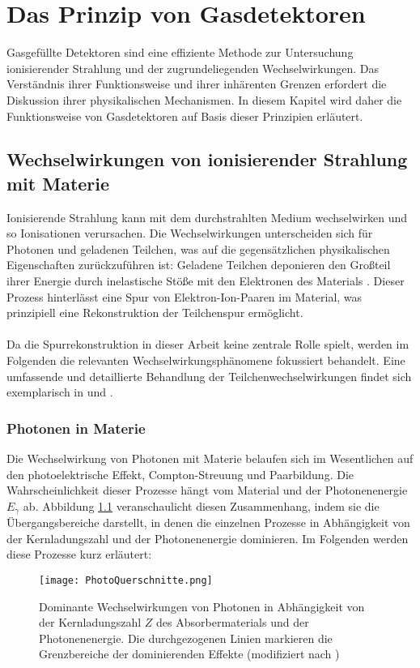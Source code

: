 \chapter{Das Prinzip von Gasdetektoren}

\noindent Gasgefüllte Detektoren sind eine effiziente Methode zur Untersuchung ionisierender Strahlung und der zugrundeliegenden Wechselwirkungen. Das Verständnis ihrer Funktionsweise und ihrer inhärenten Grenzen erfordert die Diskussion ihrer physikalischen Mechanismen. In diesem Kapitel wird daher die Funktionsweise von Gasdetektoren auf Basis dieser Prinzipien erläutert.

	\section{Wechselwirkungen von ionisierender Strahlung mit Materie}
	Ionisierende Strahlung kann mit dem durchstrahlten Medium wechselwirken und so Ionisationen verursachen. Die Wechselwirkungen unterscheiden sich für Photonen und geladenen Teilchen, was auf die gegensätzlichen physikalischen Eigenschaften zurückzuführen ist: Geladene Teilchen deponieren den Großteil ihrer Energie durch inelastische Stöße mit den Elektronen des Materials \cite{Leo}. Dieser Prozess hinterlässt eine Spur von Elektron-Ion-Paaren im Material, was prinzipiell eine Rekonstruktion der Teilchenspur ermöglicht.\\
	\\
	Da die Spurrekonstruktion in dieser Arbeit keine zentrale Rolle spielt, werden im Folgenden die relevanten Wechselwirkungsphänomene fokussiert behandelt. Eine umfassende und detaillierte Behandlung der Teilchenwechselwirkungen findet sich exemplarisch in \cite{Leo} und \cite{Sauli_Multiwire}.

	\subsection{Photonen in Materie}
	Die Wechselwirkung von Photonen mit Materie belaufen sich im Wesentlichen auf den photoelektrische Effekt, Compton-Streuung und Paarbildung. Die Wahrscheinlichkeit dieser Prozesse hängt vom Material und der Photonenenergie $E_{\gamma}$ ab. Abbildung \ref{fig:WirkungsquerschnittePhotonen} veranschaulicht diesen Zusammenhang, indem sie die Übergangsbereiche darstellt, in denen die einzelnen Prozesse in Abhängigkeit von der Kernladungszahl und der Photonenenergie dominieren. Im Folgenden werden diese Prozesse kurz erläutert:
	\begin{figure}[h]
		\centering
		\texttt{[image: PhotoQuerschnitte.png]}
		\caption{Dominante Wechselwirkungen von Photonen in Abhängigkeit von der Kernladungszahl $Z$ des Absorbermaterials und der Photonenenergie. Die durchgezogenen Linien markieren die Grenzbereiche der dominierenden Effekte (modifiziert nach \cite{DemtroderKerne})}
		\label{fig:WirkungsquerschnittePhotonen}
	\end{figure}
	
